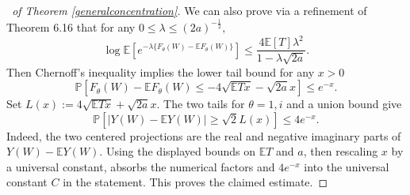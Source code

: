 \documentclass[11pt,reqno]{amsart}
\theoremstyle{plain}
\theoremstyle{remark}
\numberwithin{equation}{section}
\begin{document}
\begin{proof}[\proofname\ of Theorem \ref{generalconcentration}]
We can also prove via a refinement of \cite{10.1093/acprof:oso/9780199535255.001.0001} Theorem 6.16 that for any $0\leq\lambda\leq (2a)^{-\frac{1}{2}},$
$$
\log\mathbb{E}\left[e^{-\lambda\{F_\theta(W)-\mathbb{E}F_\theta(W)\}}\right]\leq\frac{4\mathbb{E}[T]\lambda^2}{1-\lambda\sqrt{2a}}.
$$Then Chernoff's inequality implies the lower tail bound for any $x>0$
$$ \mathbb{P}\left[F_\theta(W)-\mathbb{E}F_\theta(W)\leq-4\sqrt{\mathbb{E}Tx}-\sqrt{2a}x
\right]\leq e^{-x}.
    $$
Set $L(x):=4\sqrt{\mathbb{E}Tx}+\sqrt{2a}x$. The two tails for $\theta=1,i$ and a union bound give
\[
\mathbb{P}\left[\left|Y(W)-\mathbb{E}Y(W)\right|\geq\sqrt{2}L(x)\right]\leq4e^{-x}.
\]
Indeed, the two centered projections are the real and negative imaginary parts of $Y(W)-\mathbb{E}Y(W)$. Using the displayed bounds on $\mathbb{E}T$ and $a$, then rescaling $x$ by a universal constant, absorbs the numerical factors and $4e^{-x}$ into the universal constant $C$ in the statement. This proves the claimed estimate.
    \end{proof}




\printbibliography
\end{document}
